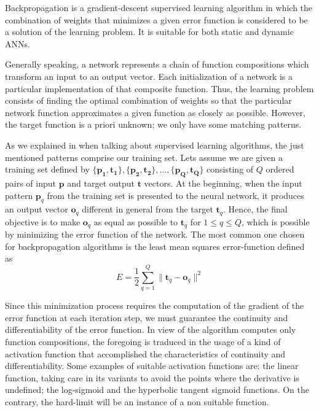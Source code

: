 
\label{sec:generalbackprop}

Backpropagation is a gradient-descent supervised learning algorithm 
in which the combination of weights that minimizes a given error function is considered to be a solution of the learning problem. It is suitable for both static and dynamic ANNs.

Generally speaking, a network represents a chain of function compositions which transform an input to an output vector. Each initialization of a network is a particular implementation
of that composite function. Thus, the learning problem consists of finding the optimal combination of weights so that the particular network function approximates a given function as closely as possible. However, the target function is a priori unknown; we only have some matching patterns.

As we explained in  when talking about supervised learning algorithms, the just mentioned patterns comprise our training set. Lets assume we are given a training set defined by $\{\mathbf{p_{1}} , \mathbf{t_{1}} \}, \{\mathbf{p_{2}} , \mathbf{t_{2}}\}, ...,
 \{\mathbf{p_{Q}} , \mathbf{t_{Q}} \}$
consisting of $Q$ ordered pairs of input $\mathbf{p}$ and target output $\mathbf{t}$ vectors.
At the beginning, 
when the input pattern $\mathbf{p}_{q}$ from the training set is presented to the neural network,
it produces an output vector $\mathbf{o}_{q}$ different in general from the target $\mathbf{t}_{q}$.
Hence, the final objective is to make $\mathbf{o}_{q}$ as equal as possible to $\mathbf{t}_{q}$ for $1 \leq q \leq Q$, which is possible by minimizing the error function of the network. 
The most common one chosen for backpropagation algorithms is the least mean squares
error-function defined as
\begin{equation}
E=\frac{1}{2}\sum_{q=1}^{Q}
\parallel \mathbf{t}_{q}-\mathbf{o}_{q} \parallel^2
\label{eq:globalerrorfunction}
\end{equation}

Since this minimization process requires the computation of the gradient of the error function at each iteration step,
we must guarantee the continuity and differentiability of the error function.
In view of the algorithm computes only function compositions, 
the foregoing is traduced in the usage of a kind of activation function that accomplished the characteristics of continuity and differentiability. 
Some examples of suitable activation functions are: 
the linear function, taking care in its variants to avoid the points where the derivative is undefined; 
the log-sigmoid and the hyperbolic tangent sigmoid functions. 
On the contrary, the hard-limit will be an instance of a non suitable function.

